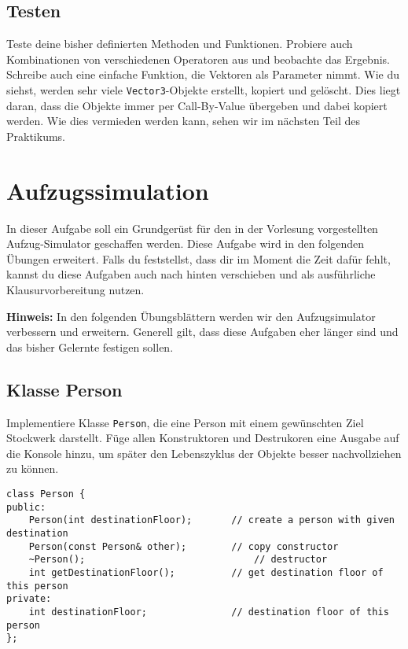\subsection{Testen}
Teste deine bisher definierten Methoden und Funktionen.
Probiere auch Kombinationen von verschiedenen Operatoren aus und beobachte das Ergebnis.
Schreibe auch eine einfache Funktion, die Vektoren als Parameter nimmt.
Wie du siehst, werden sehr viele \texttt{Vector3}-Objekte erstellt, kopiert und gelöscht.
Dies liegt daran, dass die Objekte immer per Call-By-Value übergeben und dabei kopiert werden.
Wie dies vermieden werden kann, sehen wir im nächsten Teil des Praktikums.



\newpage
\section{Aufzugssimulation}
In dieser Aufgabe soll ein Grundgerüst für den in der Vorlesung vorgestellten Aufzug-Simulator geschaffen werden.
Diese Aufgabe wird in den folgenden Übungen erweitert.
Falls du feststellst, dass dir im Moment die Zeit dafür fehlt, kannst du diese Aufgaben auch nach hinten verschieben und als ausführliche Klausurvorbereitung nutzen.


\textbf{Hinweis:}
In den folgenden Übungsblättern werden wir den Aufzugsimulator verbessern und erweitern.
Generell gilt, dass diese Aufgaben eher länger sind und das bisher Gelernte festigen sollen.


\subsection{Klasse Person}
Implementiere Klasse \texttt{Person}, die eine Person mit einem gewünschten Ziel Stockwerk darstellt.
Füge allen Konstruktoren und Destrukoren eine Ausgabe auf die Konsole hinzu, um später den Lebenszyklus der Objekte besser nachvollziehen zu können.

\begin{lstlisting}
class Person {
public:
	Person(int destinationFloor);		// create a person with given destination
	Person(const Person& other);		// copy constructor
	~Person();								// destructor
	int getDestinationFloor();			// get destination floor of this person
private:
	int destinationFloor;				// destination floor of this person
};
\end{lstlisting}

